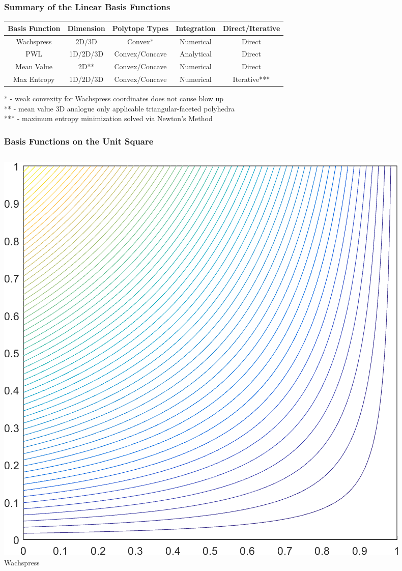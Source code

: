 \documentclass[compress,10pt]{beamer}
\begin{document}
\begin{frame}[t]
{
\frametitle{Summary of the Linear Basis Functions}
\centering
\vspace{1cm}
\begin{table}
\footnotesize
\begin{tabular}{|c|c|c|c|c|}
\hline
Basis Function & Dimension & Polytope Types & Integration & Direct/Iterative \\
\hline \hline
Wachspress	&2D/3D&	Convex*&	Numerical	&Direct\\ \hline
PWL&	1D/2D/3D&	Convex/Concave&	Analytical	&Direct\\ \hline
Mean Value&	2D**&	Convex/Concave&	Numerical	&Direct\\ \hline
Max Entropy&	1D/2D/3D	&Convex/Concave&	Numerical&	Iterative***\\ \hline
\end{tabular}
\end{table}
\vspace{0.5cm}
\begin{block}{}
* - weak convexity for Wachspress coordinates does not cause blow up\\
** - mean value 3D analogue only applicable triangular-faceted polyhedra \\
*** - maximum entropy minimization solved via Newton's Method 
\end{block}
}
{
\frametitle{Basis Functions on the Unit Square}
\begin{columns}
\centering
{}\includegraphics[width=0.55\columnwidth]{images/square_WACHSPRESS1_contour_b4.png} \\
Wachspress\\ \vspace{3mm}

\end{columns}}
\end{frame}
\end{document}
